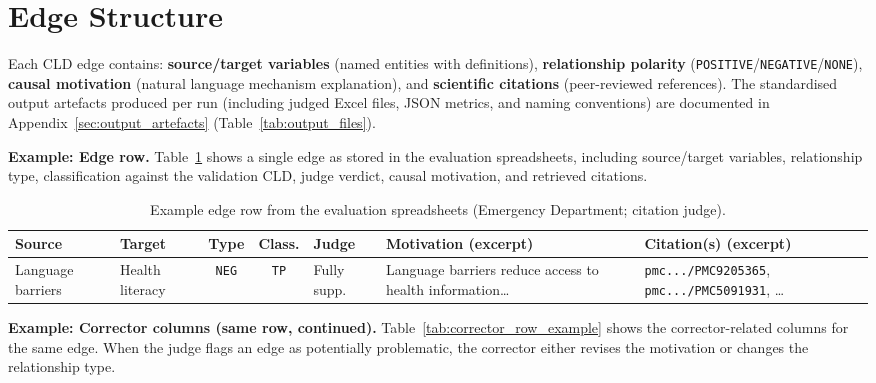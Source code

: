 \section{Edge Structure}
Each CLD edge contains: \textbf{source/target variables} (named entities with definitions), \textbf{relationship polarity} (\texttt{POSITIVE}/\texttt{NEGATIVE}/\texttt{NONE}), \textbf{causal motivation} (natural language mechanism explanation), and \textbf{scientific citations} (peer-reviewed references).
The standardised output artefacts produced per run (including judged Excel files, JSON metrics, and naming conventions) are documented in Appendix~\ref{sec:output_artefacts} (Table~\ref{tab:output_files}).

\noindent\textbf{Example: Edge row.} Table~\ref{tab:edge_row_example} shows a single edge as stored in the evaluation spreadsheets, including source/target variables, relationship type, classification against the validation CLD, judge verdict, causal motivation, and retrieved citations.

\begin{table}[H]
\centering
\footnotesize
\setlength{\tabcolsep}{4pt}
\begin{tabularx}{\textwidth}{@{}l l c c l X X@{}}
\toprule
\textbf{Source} & \textbf{Target} & \textbf{Type} & \textbf{Class.} & \textbf{Judge} & \textbf{Motivation (excerpt)} & \textbf{Citation(s) (excerpt)} \\
\midrule
Language barriers & Health literacy & \texttt{NEG} & \texttt{TP} & Fully supp. &
Language barriers reduce access to health information\ldots &
\texttt{pmc.../PMC9205365}, \texttt{pmc.../PMC5091931}, \ldots \\
\bottomrule
\end{tabularx}
\caption[Example edge row]{Example edge row from the evaluation spreadsheets (Emergency Department; \PromptMechanisticLit{} citation judge).}
\label{tab:edge_row_example}
\end{table}

\noindent\textbf{Example: Corrector columns (same row, continued).} Table~\ref{tab:corrector_row_example} shows the corrector-related columns for the same edge. When the judge flags an edge as potentially problematic, the corrector either revises the motivation or changes the relationship type.

